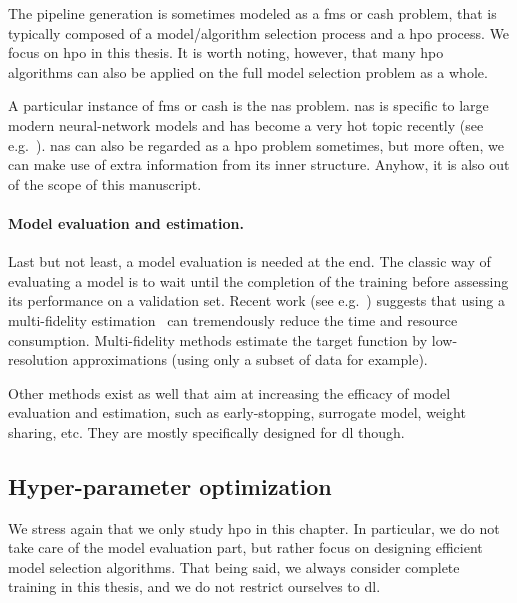 The pipeline generation is sometimes modeled as a \gls{fms} or \gls{cash} problem, that is typically composed of a model/algorithm selection process and a \gls{hpo} process. We focus on \gls{hpo} in this thesis. It is worth noting, however, that many \gls{hpo} algorithms can also be applied on the full model selection problem as a whole.

A particular instance of \gls{fms} or \gls{cash} is the \gls{nas} problem. \gls{nas} is specific to large modern neural-network models and has become a very hot topic recently (see e.g.~\citealt{elsken2018nas,zoph2018nas,kandasamy2018nas,liu2019darts}). \gls{nas} can also be regarded as a \gls{hpo} problem sometimes, but more often, we can make use of extra information from its inner structure. Anyhow, it is also out of the scope of this manuscript.

\paragraph{Model evaluation and estimation.}
Last but not least, a model evaluation is needed at the end. The classic way of evaluating a model is to wait until the completion of the training before assessing its performance on a validation set. Recent work (see e.g.~\citealt{li2017hyperband}) suggests that using a multi-fidelity estimation~\citep{huang2006multifidelity,wu2019multi-fidelity,peherstorfer2018multifidelity} can tremendously reduce the time and resource consumption. Multi-fidelity methods estimate the target function by low-resolution approximations (using only a subset of data for example).

Other methods exist as well that aim at increasing the efficacy of model evaluation and estimation, such as early-stopping, surrogate model, weight sharing, etc. They are mostly specifically designed for \gls{dl} though.
    

\subsection{Hyper-parameter optimization}\label{sec:dttts.survey.hpo}

We stress again that we only study \gls{hpo} in this chapter. In particular, we do not take care of the model evaluation part, but rather focus on designing efficient model selection algorithms. That being said, we always consider complete training in this thesis, and we do not restrict ourselves to \gls{dl}.

